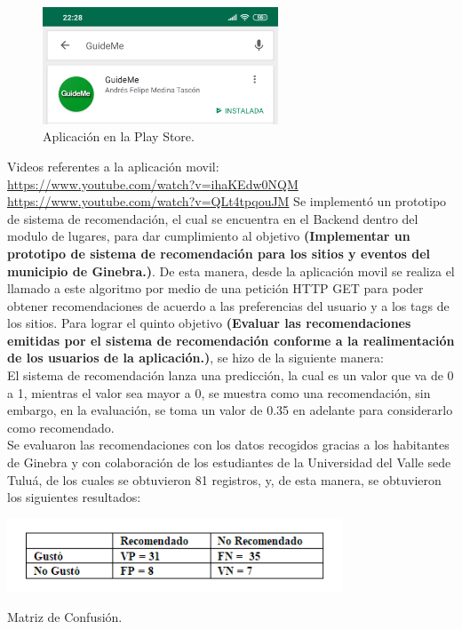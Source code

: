 \documentclass[12pt,letterpaper,openany]{book}
\begin{document}
\begin{figure}[H]
\begin{center}
\includegraphics[width=7cm]{./imagenes/gm}
\caption{Aplicación en la Play Store.}
\end{center}
\end{figure}
Videos referentes a la aplicación movil: \\
\url{https://www.youtube.com/watch?v=ihaKEdw0NQM}\\
\url{https://www.youtube.com/watch?v=QLt4tpqouJM}
\vspace{5mm}\newline
Se implementó un prototipo de sistema de recomendación, el cual se encuentra en el Backend dentro del modulo de lugares, para dar cumplimiento al objetivo \textbf{(Implementar un prototipo de sistema de recomendación para los sitios y eventos del municipio de Ginebra.)}. De esta manera, desde la aplicación movil se realiza el llamado a este algoritmo por medio de una petición HTTP GET para poder obtener recomendaciones de acuerdo a las preferencias del usuario y a los tags de los sitios.
\vspace{5mm}\newline
Para lograr el quinto objetivo \textbf{(Evaluar las recomendaciones emitidas por el sistema de recomendación conforme a la realimentación de los usuarios de la aplicación.)}, se hizo de la siguiente manera:\\
El sistema de recomendación lanza una predicción, la cual es un valor que va de 0 a 1, mientras el valor sea mayor a 0, se muestra como una recomendación, sin embargo, en la evaluación, se toma un valor de 0.35 en adelante para considerarlo como recomendado. \\
Se evaluaron las recomendaciones con  los datos recogidos gracias a los habitantes de Ginebra y con colaboración de los estudiantes de la Universidad del Valle sede Tuluá, de los cuales se obtuvieron 81 registros, y, de esta manera, se obtuvieron los siguientes resultados:
\begin{table}[H]
\centering
\includegraphics[width=10cm]{./imagenes/PrecisionRecall}
\caption{Matriz de Confusión.}
\end{table}
\end{document}
